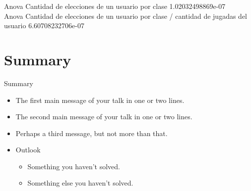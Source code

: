 \documentclass{beamer}
\begin{document}
                   


Anova Cantidad de elecciones de un usuario por clase 1.02032498869e-07 \\
Anova Cantidad de elecciones de un usuario por clase / cantidad de jugadas del usuario 6.60708232706e-07 \\


\section*{Summary}

\begin{frame}{Summary}
  \begin{itemize}
  \item
    The \alert{first main message} of your talk in one or two lines.
  \item
    The \alert{second main message} of your talk in one or two lines.
  \item
    Perhaps a \alert{third message}, but not more than that.
  \end{itemize}
  
  \begin{itemize}
  \item
    Outlook
    \begin{itemize}
    \item
      Something you haven't solved.
    \item
      Something else you haven't solved.
    \end{itemize}
  \end{itemize}
\end{frame}
\end{document}
